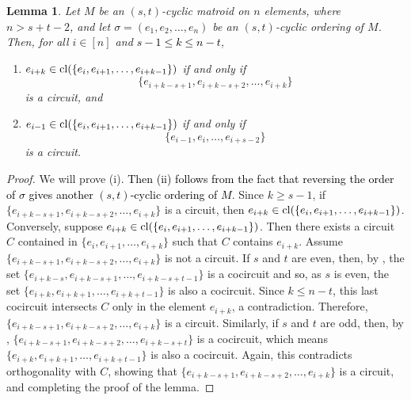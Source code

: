\documentclass[11pt]{amsart}
\newtheorem{lemma}[theorem]{Lemma}
\newcommand{\cl}{{\rm cl}}
\newcommand{\blue}{\textcolor{black}}
\newcommand{\bloo}{\textcolor{black}}
\begin{document}
\begin{lemma}
\label{closure}
Let $M$ be an $(s, t)$-cyclic matroid on $n$ elements, where $n > s+t-2$, and let $\sigma = (e_1, e_2, \ldots, e_n)$ be an $(s, t)$-cyclic ordering of $M$. Then, for all $i \in [n]$ and \blue{$s-1 \leq k \leq n-t$},
\begin{enumerate}[{\rm (i)}]
\item $e_{i+k} \in \cl(\{e_i, e_{i+1}, \ldots, e_{i+k-1}\})$ if and only if
\[\{e_{i+k-s+1}, e_{i+k-s+2}, \ldots, e_{i+k}\}\]
is a circuit, and
\item $e_{i-1} \in \cl(\{e_i, e_{i+1}, \ldots, e_{i+k-1}\})$ if and only if 
\[\{e_{i-1}, e_i, \ldots, e_{i+s-2}\}\]
 is a circuit.
\end{enumerate}
\end{lemma}


\begin{proof}
We will prove (i). \bloo{Then (ii) follows from the fact that reversing the order of $\sigma$ gives another $(s,t)$-cyclic ordering of $M$}. Since $k \geq s-1$, if $\{e_{i+k-s+1},e_{i+k-s+2},\ldots,e_{i+k}\}$ is a circuit, then $e_{i+k} \in \cl(\{e_i,e_{i+1},\ldots,e_{i+k-1}\})$. Conversely, suppose $e_{i+k} \in \cl(\{e_i,e_{i+1},\ldots,e_{i+k-1}\})$. Then there exists a circuit $C$ contained in $\{e_i,e_{i+1},\ldots,e_{i+k}\}$ such that $C$ contains $e_{i+k}$. Assume $\{e_{i+k-s+1},e_{i+k-s+2},\ldots,e_{i+k}\}$ is not a circuit. If $s$ and $t$ are even, then, by , the set $\{e_{i+k-s},e_{i+k-s+1},\ldots,e_{i+k-s+t-1}\}$ is a cocircuit and \bloo{so}, as $s$ is even, the set $\{e_{i+k},e_{i+k+1},\ldots,e_{i+k+t-1}\}$ is also a cocircuit. Since $k \leq n-t$, this last cocircuit intersects $C$ only in the element $e_{i+k}$, a contradiction. Therefore, $\{e_{i+k-s+1},e_{i+k-s+2},\ldots,e_{i+k}\}$ is a circuit. Similarly, if $s$ and $t$ are odd, then, by , $\{e_{i+k-s+1}, e_{i+k-s+2}, \ldots, e_{i+k-s+t}\}$ is a cocircuit, which means $\{e_{i+k},e_{i+k+1},\ldots,e_{i+k+t-1}\}$ is also a cocircuit. Again, this contradicts orthogonality with $C$, showing that $\{e_{i+k-s+1},e_{i+k-s+2},\ldots,e_{i+k}\}$ is a circuit, and completing the proof of the lemma.
\end{proof}
\end{document}

